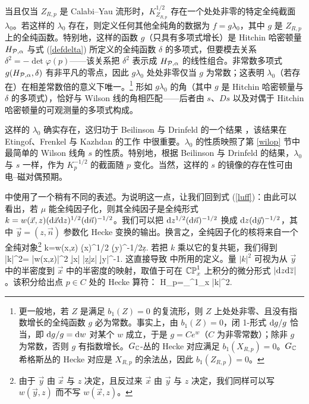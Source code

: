 当且仅当 $Z_{R,p}$ 是 Calabi–Yau 流形时，$K_{Z_{R,p}}^{1/2}$ 存在一个处处非零的特定全纯截面 $\lambda_0$。若这样的 $\lambda_0$ 存在，则定义任何其他全纯角的数据为 $f= g \lambda_0$，其中 $g$ 是 $Z_{R,p}$ 上的全纯函数。特别地，这样的函数 $g$（只具有多项式增长）是 Hitchin 哈密顿量 $H_{\P,\alpha}$ 与式 (\ref{defdelta}) 所定义的全纯函数 $\delta$ 的多项式，但要模去关系 $\delta^2 = -\det \varphi(p)$——该关系把 $\delta^2$ 表示成 $H_{\P,\alpha}$ 的线性组合。非常数多项式 $g(H_{\P,\alpha},\delta)$ 有非平凡的零点，因此 $g\lambda_0$ 处处非零仅当 $g$ 为常数；这表明 $\lambda_0$（若存在）在相差常数倍的意义下唯一。\footnote{更一般地，若 $Z$ 是满足 $b_1(Z)=0$ 的复流形，则 $Z$ 上处处非零、且没有指数增长的全纯函数 $g$ 必为常数。事实上，由 $b_1(Z)=0$，闭 1-形式 $\d g/g$ 恰当，即 $\d g/g=\d w$ 对某个 $w$ 成立，于是 $g=C e^w$（$C$ 为非零常数）；除非 $g$ 为常数，否则 $g$ 有指数增长。$G_\C$-丛的 Hecke 对应满足 $b_1(X_{R,p})=0$。$G_\C$ 希格斯丛的 Hecke 对应是 $X_{R,p}$ 的余法丛，因此 $b_1(Z_{R,p})=0$。}
形如 $g \lambda_0$ 的角（其中 $g$ 是 Hitchin 哈密顿量与 $\delta$ 的多项式），恰好与 Wilson 线的角相匹配——后者由 $s$、$Ds$ 以及对偶于 Hitchin 哈密顿量的可观测量的多项式构成。


这样的 $\lambda_0$ 确实存在，这归功于 Beilinson 与 Drinfeld 的一个结果 \cite{BD}，该结果在 Etingof、Frenkel 与 Kazhdan 的工作 \cite{EFK2} 中很重要。$\lambda_0$ 的性质映照了第 \ref{wilop} 节中最简单的 Wilson 线角 $s$ 的性质。特别地，根据 Beilinson 与 Drinfeld 的结果，$\lambda_0$ 与 $s$ 一样，作为 $K_p^{-1/2}$ 的截面随 $p$ 变化。当然，这样的 $s$ 的镜像的存在性可由电–磁对偶预期。
 
\cite{EFK2} 中使用了一个稍有不同的表述。为说明这一点，让我们回到式 (\ref{luff})：由此可以看出，若 $\mu$ 能全纯因子化，则其全纯因子是全纯形式 $k = w(\vec x,z) (\d \vec x    \d z)^{1/2}  (\d \vec n)^{-1/2}$。我们可以把 $\d z^{1/2} (\d\vec n)^{-1/2}$ 换成 $\d z (\d \vec y)^{-1/2}$，其中 $\vec y=(z,\vec n)$ 参数化 Hecke 变换的输出。换言之，全纯因子化的核将来自一个全纯对象\footnote{由于 $\vec y$ 由 $\vec x$ 与 $z$ 决定，且反过来 $\vec x$ 由 $\vec y$ 与 $z$ 决定，我们同样可以写 $w(\vec y,z)$ 而不写 $w(\vec x,z)$。}
 \be\label{conf} k=w(\vec x,z) (\d \vec x)^{1/2} (\d\vec y)^{-1/2}\d z. \ee 
若把 $k$ 乘以它的复共轭，我们得到
 \be\label{onf}|k|^2= |w(\vec x,z)|^2 |\d\vec x| |\d z\d\bar z| |\d\vec y|^{-1}.\ee
这直接导致 \cite{EFK2} 中所用的定义。量 $|k|^2$ 可视为从 $\vec y$ 中的半密度到 $\vec x$ 中的半密度的映射，取值于可在 $\bCP^1_x$ 上积分的微分形式 $|\d z \d\bar z|$。该积分给出点 $p\in C$ 处的 Hecke 算符：
 \be\label{tonf} H_p=\int_{\bCP^1_x} |k|^2. \ee
  
